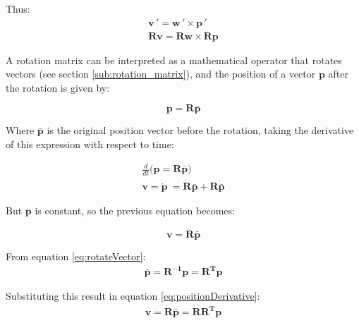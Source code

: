 \documentclass[a4paper]{report}
\begin{document}
Thus:
\begin{equation}
\begin{split}
    \boldsymbol{v}\,' = \boldsymbol{w}\,' \times \boldsymbol{p}\,' \\
    \boldsymbol{R}\boldsymbol{v} = \boldsymbol{R} \boldsymbol{w} \times \boldsymbol{R} \boldsymbol{p}
\end{split}
\end{equation}

A rotation matrix can be interpreted as a mathematical operator that rotates vectors
(see section \ref{sub:rotation_matrix}), and the position of a vector $\boldsymbol{p}$
after the rotation is given by:

\begin{equation}
    \boldsymbol{p} = \boldsymbol{R} \bar{\boldsymbol{p}} \label{eq:rotateVector}
\end{equation}

Where $\bar{\boldsymbol{p}}$ is the original position vector before the rotation,
taking the derivative of this expression with respect to time:

\begin{equation}
\begin{split}
    \frac{d}{dt}\big( \boldsymbol{p} = \boldsymbol{R} \bar{\boldsymbol{p}} \big) \\
    \boldsymbol{v} = \dot{\boldsymbol{p}}\ = \boldsymbol{\dot{R}} \bar{\boldsymbol{p}} + \boldsymbol{R} \dot{\bar{\boldsymbol{p}}}
\end{split}
\end{equation}

But $\bar{\boldsymbol{p}}$ is constant, so the previous equation becomes:

\begin{equation}
    \boldsymbol{v} = \boldsymbol{\dot{R}} \bar{\boldsymbol{p}} \label{eq:positionDerivative}
\end{equation}

From equation \eqref{eq:rotateVector}:
\begin{equation}
\begin{split}
    \bar{\boldsymbol{p}} = \boldsymbol{R^{-1}} \boldsymbol{p} = \boldsymbol{R^{T}} \boldsymbol{p}
\end{split}
\end{equation}

Substituting this result in equation \eqref{eq:positionDerivative}:
\begin{equation}
\begin{split}
    \boldsymbol{v} = \boldsymbol{\dot{R}} \bar{\boldsymbol{p}} = \boldsymbol{\dot{R}} \boldsymbol{R^{T}} \boldsymbol{p}
\end{split}
\end{equation}
\end{document}
